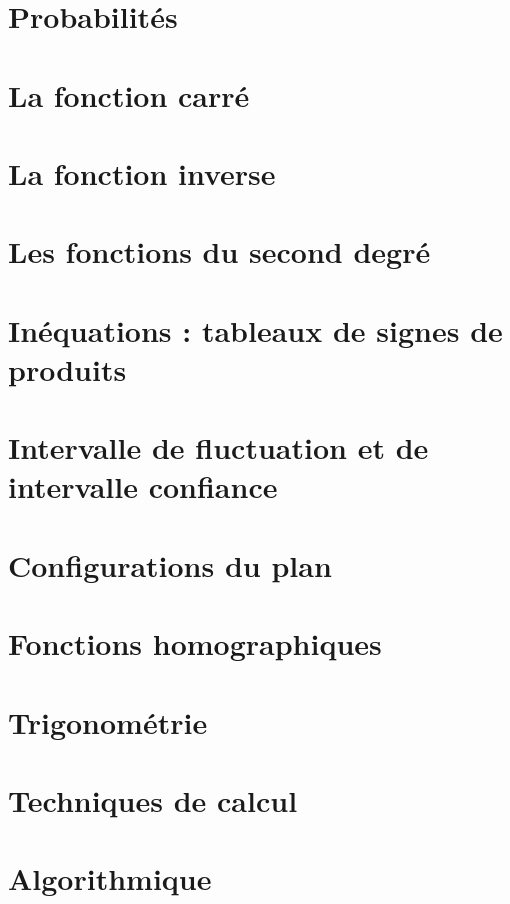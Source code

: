 \documentclass[a4paper,12pt]{book}
\begin{document}
\chapter{Probabilités}


\chapter{La fonction carré}


\chapter{La fonction inverse}


\chapter{Les fonctions du second degré}


\chapter{Inéquations : tableaux de signes de produits}


\chapter{Intervalle de fluctuation et de intervalle confiance}


\chapter{Configurations du plan}


\chapter{Fonctions homographiques}


\chapter{Trigonométrie}


\chapter{Techniques de calcul}


\chapter{Algorithmique}

\end{document}

